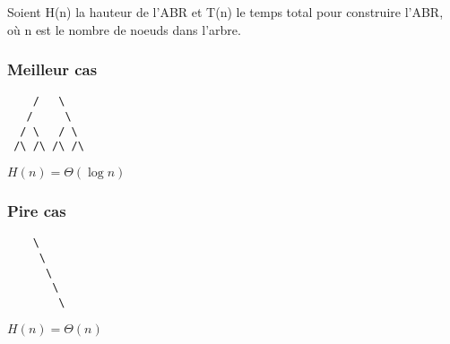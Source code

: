     Soient H(n) la hauteur de l'ABR et T(n) le temps total pour construire l'ABR, où n est le nombre de noeuds dans l'arbre.
    \subsubsection{Meilleur cas}
	\begin{verbatim}
    /   \ 
   /     \
  / \   / \
 /\ /\ /\ /\
 \end{verbatim}
 
$ H(n) = \Theta(\log n)$
    \subsubsection{Pire cas}
	\begin{verbatim}
    \
     \ 
      \ 
       \
        \
 \end{verbatim}
        
$        H(n) = \Theta(n)$
